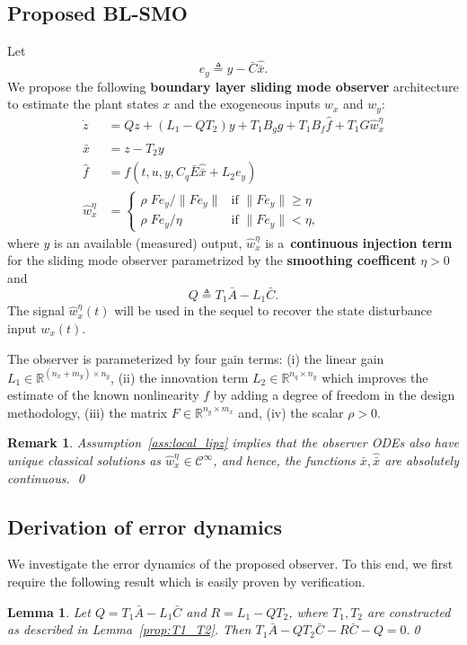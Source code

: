 \documentclass[times, doublespace]{rncauth}
\newcommand{\hb}[1]{\hat{\bar{#1}}}
\newtheorem{lemma}{Lemma}
\newtheorem{remark}{Remark}
\begin{document}
\subsection{Proposed BL-SMO}
Let $$e_y \triangleq y - \bar C\hb x.$$ We propose the following \textbf{boundary layer sliding mode observer} architecture to estimate the plant states $x$ and the exogeneous inputs $w_x$ and $w_y$:
\begin{subequations}
	\label{eq:obs}
	\begin{align}
	\dot z &= Q z + (L_1 - Q T_2) y + T_1 B_g g + T_1 B_f \hat f + T_1 G \hat w_x^\eta\\
		\label{eq:obs_b}
	\hb x &= z - T_2 y\\
	\label{eq:obs_c}
	\hat f &= f(t, u, y, C_q\bar E\hb x + L_2 e_y)\\
	\label{eq:obs_d}\hat w^\eta_x &= \begin{cases}
	\rho\;Fe_y/\|Fe_y\| & \text{if $\|Fe_y\|\ge \eta$}\\
	\rho \; Fe_y/\eta & \text{if $\|Fe_y\|<\eta$},
	\end{cases}
	\end{align}
\end{subequations}
where $y$ is an available (measured) output, $\hat w^\eta_x$ is a~\textbf{continuous injection term} for the sliding mode observer parametrized by the \textbf{smoothing coefficent} $\eta>0$ and 
\[
Q \triangleq T_1\bar A- L_1\bar C.
\]
The signal $\hat w^\eta_x(t)$ will be used in the sequel to recover the state disturbance input $w_x(t)$. 


The observer is parameterized by four gain terms: (i) the linear gain $L_1 \in\mathbb{R}^{(n_x+m_y)\times n_y}$, (ii) the innovation term $L_2\in\mathbb{R}^{n_q \times n_y}$ which improves the estimate of the known nonlinearity $f$ by adding a degree of freedom in the design methodology, (iii) the matrix $F\in\mathbb{R}^{n_y\times m_x}$ and, (iv) the scalar $\rho>0$. 
\begin{remark}\label{rk:abs_cont_e}
	Assumption~\ref{ass:local_lipz} implies that the observer ODEs also have unique classical solutions as $\hat w^\eta_x\in\mathcal C^\infty$, and hence, the functions $\bar x, \hb x$ are absolutely continuous.
\qed	\end{remark}
\subsection{Derivation of error dynamics}
We investigate the error dynamics of the proposed observer. To this end, we first require the following result which is easily proven by verification.
\begin{lemma}\label{prop:Q_zero}
	Let $Q=T_1\bar A - L_1\bar C$ and $R=L_1 - Q T_2$, where $T_1, T_2$ are constructed as described in Lemma~\ref{prop:T1_T2}. Then $T_1 \bar A - Q T_2 \bar C - R\bar C - Q = 0.$\qed
\end{lemma}
\end{document}
